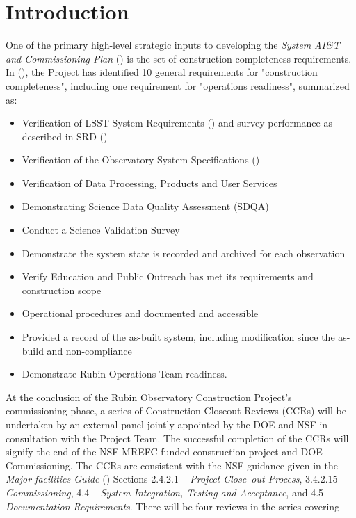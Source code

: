 
\section {Introduction}

One of the primary high-level strategic inputs to developing the {\it System AI\&T and Commissioning Plan} () is the set of construction completeness requirements.
In (), the Project has identified 10 general requirements for "construction completeness", including one requirement for "operations readiness", summarized as:

\begin{itemize}
        \item Verification of LSST System Requirements () and survey performance as described in SRD ()
        \item Verification of the Observatory System Specifications ()
        \item Verification of Data Processing, Products and User Services
        \item Demonstrating Science Data Quality Assessment (SDQA)
        \item Conduct a Science Validation Survey
        \item Demonstrate the system state is recorded and archived for each observation
        \item Verify Education and Public Outreach has met its requirements and construction scope
        \item Operational procedures and documented and accessible
        \item Provided a record of the as-built system, including modification since the as-build and non-compliance
        \item Demonstrate Rubin Operations Team readiness.
\end{itemize}

At the conclusion of the Rubin Observatory Construction Project's commissioning phase, a series of Construction Closeout Reviews (CCRs) will be undertaken by an external panel jointly appointed by the DOE and NSF in consultation with the Project Team.
The successful completion of the CCRs will signify the end of the NSF MREFC-funded construction project and DOE Commissioning.
The CCRs are consistent with the NSF guidance given in the {\it Major facilities Guide} () Sections 2.4.2.1 -- {\it Project Close--out Process}, 3.4.2.15 -- {\it Commissioning}, 4.4 -- {\it System Integration, Testing and Acceptance}, and 4.5 -- {\it Documentation Requirements}.
There will be four reviews in the series covering

